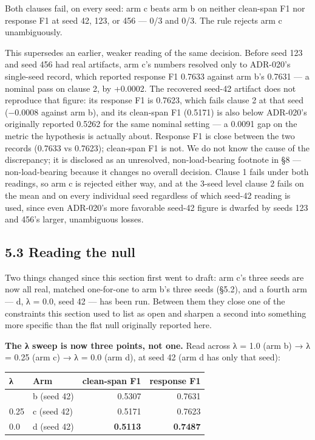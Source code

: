 \documentclass[11pt]{article}
\newcounter{none}
\begin{document}
Both clauses fail, on every seed: arm c beats arm b on neither clean-span F1 nor response F1
at seed 42, 123, or 456 --- 0/3 and 0/3. The rule rejects arm c unambiguously.

This supersedes an earlier, weaker reading of the same decision. Before seed 123 and seed
456 had real artifacts, arm c's numbers resolved only to ADR-020's single-seed record,
which reported response F1 0.7633 against arm b's 0.7631 --- a nominal pass on clause 2, by
+0.0002. The recovered seed-42 artifact does not reproduce that figure: its response F1 is
0.7623, which fails clause 2 at that seed (−0.0008 against arm b), and its clean-span F1
(0.5171) is also below ADR-020's originally reported 0.5262 for the same nominal setting --- a
0.0091 gap on the metric the hypothesis is actually about. Response F1 is close between the
two records (0.7633 vs 0.7623); clean-span F1 is not. We do not know the cause of the
discrepancy; it is disclosed as an unresolved, non-load-bearing footnote in §8 ---
non-load-bearing because it changes no overall decision. Clause 1 fails under both readings,
so arm c is rejected either way, and at the 3-seed level clause 2 fails on the mean and on
every individual seed regardless of which seed-42 reading is used, since even ADR-020's more
favorable seed-42 figure is dwarfed by seeds 123 and 456's larger, unambiguous losses.

\subsection{5.3 Reading the null}\label{reading-the-null}

Two things changed since this section first went to draft: arm c's three seeds are now all
real, matched one-for-one to arm b's three seeds (§5.2), and a fourth arm --- d, λ = 0.0,
seed 42 --- has been run. Between them they close one of the constraints this section used to
list as open and sharpen a second into something more specific than the flat null originally
reported here.

\textbf{The λ sweep is now three points, not one.} Read across λ = 1.0 (arm b) → λ = 0.25
(arm c) → λ = 0.0 (arm d), at seed 42 (arm d has only that seed):

{\def\LTcaptype{none} %
\begin{longtable}[]{@{}llrr@{}}
\toprule\noalign{}
λ & Arm & clean-span F1 & response F1 \\
\midrule\noalign{}
\endhead
\bottomrule\noalign{}
\endlastfoot
1.0 & b (seed 42) & 0.5307 & 0.7631 \\
0.25 & c (seed 42) & 0.5171 & 0.7623 \\
0.0 & d (seed 42) & \textbf{0.5113} & \textbf{0.7487} \\
\end{longtable}
}
\end{document}
